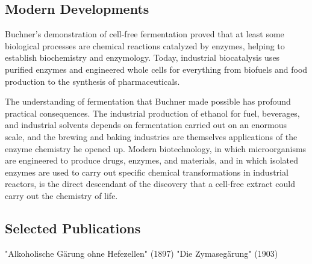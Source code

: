 \subsection*{Modern Developments}

Buchner's demonstration of cell-free fermentation proved that at least some biological processes are chemical reactions catalyzed by enzymes, helping to establish biochemistry and enzymology. Today, industrial biocatalysis uses purified enzymes and engineered whole cells for everything from biofuels and food production to the synthesis of pharmaceuticals.

The understanding of fermentation that Buchner made possible has profound practical consequences. The industrial production of ethanol for fuel, beverages, and industrial solvents depends on fermentation carried out on an enormous scale, and the brewing and baking industries are themselves applications of the enzyme chemistry he opened up. Modern biotechnology, in which microorganisms are engineered to produce drugs, enzymes, and materials, and in which isolated enzymes are used to carry out specific chemical transformations in industrial reactors, is the direct descendant of the discovery that a cell-free extract could carry out the chemistry of life.

\subsection*{Selected Publications}

"Alkoholische Gärung ohne Hefezellen" (1897)
"Die Zymasegärung" (1903)
